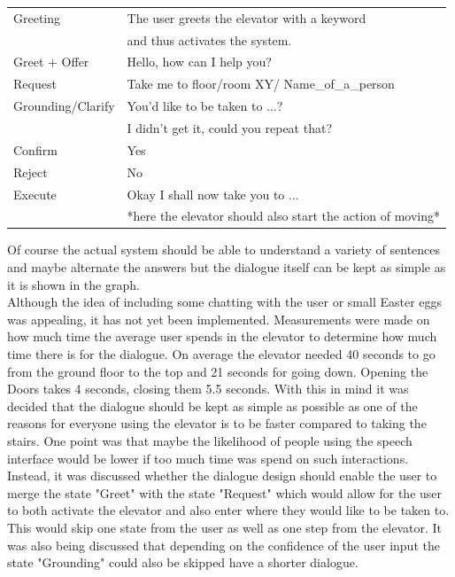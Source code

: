 \documentclass[a4paper, 12pt]{article}
\begin{document}
\begin{tabular}{|ll|}
  \hline
  Greeting & The user greets the elevator with a keyword \\
    & and thus activates the system.  \\
  Greet + Offer & Hello, how can I help you? \\
  Request & Take me to floor/room XY/ Name\_of\_a\_person \\
  Grounding/Clarify & You'd like to be taken to ...?\\ 
   & I didn't get it, could you repeat that? \\
  Confirm & Yes \\
  Reject & No \\
  Execute & Okay I shall now take you to ... \\ 
   & *here the elevator should also start the action of moving* \\
  \hline 
\end{tabular}
\newline
Of course the actual system should be able to understand a variety of sentences and maybe alternate the answers but the dialogue itself can be kept as simple as it is shown in the graph.  \\

Although the idea of including some chatting with the user or small Easter eggs was appealing, it has not yet been implemented.
Measurements were made on how much time the average user spends in the elevator to determine how much time there is for the dialogue.
On average the elevator needed 40 seconds to go from the ground floor to the top and 21 seconds for going down. Opening the Doors takes 4 seconds, closing them 5.5 seconds.
With this in mind it was decided that the dialogue should be kept as simple as possible as one of the reasons for everyone using the elevator is to be faster compared to taking the stairs.
One point was that maybe the likelihood of people using the speech interface would be lower if too much time was spend on such interactions.\\

Instead, it was discussed whether the dialogue design should enable the user to merge the state "Greet" with the state "Request" which would allow for the user to both activate the elevator and also enter where they would like to be taken to.
This would skip one state from the user as well as one step from the elevator.
It was also being discussed that depending on the confidence of the user input the state "Grounding" could also be skipped have a shorter dialogue.\\
\end{document}
